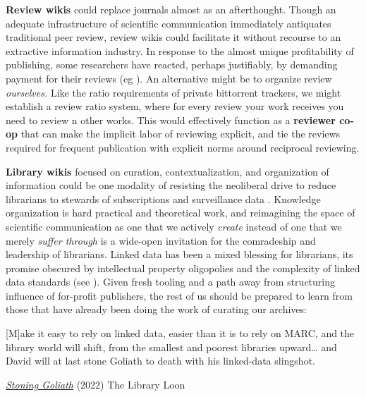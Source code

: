 \textbf{Review wikis} could replace journals almost as an afterthought.
Though an adequate infrastructure of scientific communication
immediately antiquates traditional peer review, review wikis could
facilitate it without recourse to an extractive information industry. In
response to the almost unique profitability of publishing, some
researchers have reacted, perhaps justifiably, by demanding payment for
their reviews (eg \citep{heathers450Movement2020} ). An
alternative might be to organize review \emph{ourselves.} Like the ratio
requirements of private bittorrent trackers, we might establish a review
ratio system, where for every review your work receives you need to
review n other works. This would effectively function as a
\textbf{reviewer co-op} that can make the implicit labor of reviewing
explicit, and tie the reviews required for frequent publication with
explicit norms around reciprocal reviewing.

\textbf{Library wikis} focused on curation, contextualization, and
organization of information could be one modality of resisting the
neoliberal drive to reduce librarians to stewards of subscriptions and
surveillance data \citep{lamdanLibrarianshipCrossroadsICE2019, quinnResistingNeoliberalismChallenge2017} . Knowledge organization is
hard practical and theoretical work, and reimagining the space of
scientific communication as one that we actively \emph{create} instead
of one that we merely \emph{suffer through} is a wide-open invitation
for the comradeship and leadership of librarians. Linked data has been a
mixed blessing for librarians, its promise obscured by intellectual
property oligopolies and the complexity of linked data standards (see
\citep{librariaStoningGoliath2022} ). Given fresh tooling and a
path away from structuring influence of for-profit publishers, the rest
of us should be prepared to learn from those that have already been
doing the work of curating our archives:

\begin{leftbar}
{[}M{]}ake it easy to rely on linked data, easier than it is to rely on
MARC, and the library world will shift, from the smallest and poorest
libraries upward\ldots{} and David will at last stone Goliath to death
with his linked-data slingshot.

\href{https://gavialib.com/2022/06/stoning-goliath/}{\emph{Stoning
Goliath}} (2022) The Library Loon \citep{librariaStoningGoliath2022} 
\end{leftbar}

